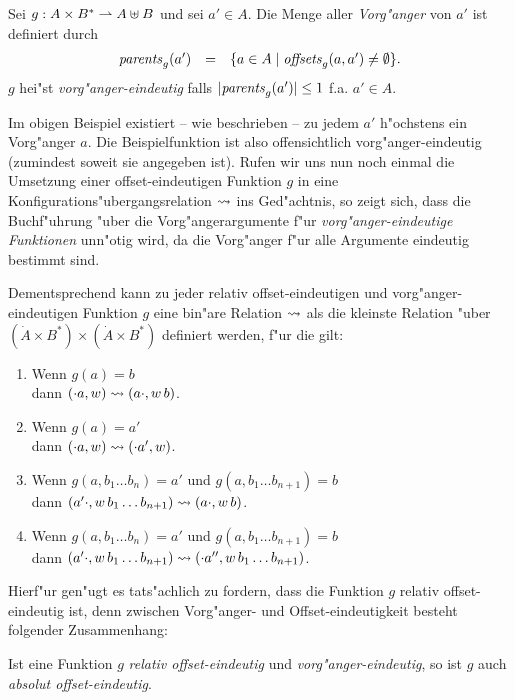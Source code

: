 \documentclass[12pt,a4paper]{article}
\begin{document}
\begin{definition}
  Sei $g: A \times B^* \rightharpoonup A \uplus B$ und sei $a'\in A$. Die Menge aller \emph{Vorg"anger} von
  $a'$ ist definiert durch
  \[\begin{array}{rcl}
    \mathit{parents}_g(a') &=& \{a \in A \mid \mathit{offsets}_g(a,a') \ne \emptyset \}.
  \end{array}\]
  $g$ hei"st \emph{vorg"anger-eindeutig} falls $|\mathit{parents}_g(a')| \le 1$ f.a. $a' \in A$.
\end{definition}

Im obigen Beispiel existiert -- wie beschrieben -- zu jedem $a'$ h"ochstens ein Vorg"anger $a$.
Die Beispielfunktion ist also offensichtlich vorg"anger-eindeutig (zumindest soweit sie angegeben
ist). Rufen wir uns nun noch einmal die Umsetzung einer offset-eindeutigen Funktion $g$ in eine
Konfigurations"ubergangsrelation $\rightsquigarrow$ ins Ged"achtnis, so zeigt sich, dass die Buchf"uhrung
"uber die Vorg"angerargumente f"ur \emph{vorg"anger-eindeutige Funktionen} unn"otig wird, da
die Vorg"anger f"ur alle Argumente eindeutig bestimmt sind.

Dementsprechend kann zu jeder relativ offset-eindeutigen und vorg"anger-eindeutigen Funktion
$g$ eine bin"are Relation $\rightsquigarrow$ als die kleinste Relation "uber
$(\dot{A} \times B^*) \times (\dot{A} \times B^*)$ definiert werden, f"ur die gilt:
\begin{enumerate}
\item Wenn $g(a) = b$ \\
  dann $(\cdot a,w) \rightsquigarrow (a \cdot,w\,b)$.
\item Wenn $g(a) = a'$ \\
  dann $(\cdot a,w) \rightsquigarrow (\cdot a',w)$.
\item Wenn $g(a,b_1 \ldots b_n) = a'$ und $g(a,b_1 \ldots b_{n+1})=b$ \\
  dann $(a' \cdot,w\,b_1 \ldots b_{n+1}) \rightsquigarrow (a \cdot,w\,b)$.
\item Wenn $g(a,b_1 \ldots b_n) = a'$ und $g(a,b_1 \ldots b_{n+1})=b$ \\
  dann $(a' \cdot,w\,b_1 \ldots b_{n+1}) \rightsquigarrow (\cdot a'',w\,b_1 \ldots b_{n+1})$.
\end{enumerate}
Hierf"ur gen"ugt es tats"achlich zu fordern, dass die Funktion $g$ relativ offset-eindeutig ist, denn
zwischen Vorg"anger- und Offset-eindeutigkeit besteht folgender Zusammenhang:

\begin{lemma}
  Ist eine Funktion $g$ \emph{relativ offset-eindeutig} und \emph{vorg"anger-eindeutig},
  so ist $g$ auch \emph{absolut offset-eindeutig}.
\end{lemma}
\end{document}
